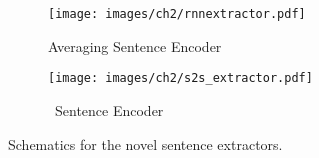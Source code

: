 \begin{figure}
\begin{subfigure}{0.5\textwidth}
  \centering
  \texttt{[image: images/ch2/rnnextractor.pdf]}
  \caption{Averaging Sentence Encoder}
  \label{fig:sfig1}
\end{subfigure}
\begin{subfigure}{0.5\textwidth}
  \centering
  \texttt{[image: images/ch2/s2s\_extractor.pdf]}
  \caption{\RecurrentNeuralNetwork~Sentence Encoder}
  \label{fig:sfig2}
\end{subfigure}
    \caption{Schematics for the novel sentence extractors.}
\label{fig:sentenceEncoders}
\end{figure}


